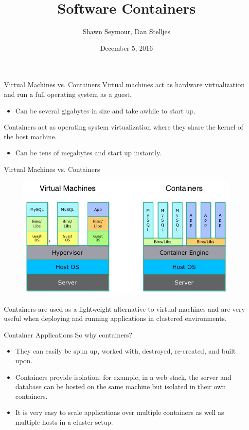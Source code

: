 \documentclass[xcolor=dvipsnames,aspectratio=1610]{beamer}
\title{Software Containers}
\date{December 5, 2016}
\author{Shawn Seymour, Dan Stelljes}
\begin{document}
  \maketitle
  \begin{frame}{Virtual Machines vs. Containers}
      \alert{Virtual machines} act as hardware virtualization and run a full operating system as a guest.
      \begin{itemize}
          \item Can be several gigabytes in size and take awhile to start up.
      \end{itemize}
      \vspace{10px}

      \alert{Containers} act as operating system virtualization where they share the kernel of the host machine.
      \begin{itemize}
          \item Can be tens of megabytes and start up instantly.
      \end{itemize}

  \end{frame}

  \begin{frame}{Virtual Machines vs. Containers}
      \begin{figure}
        \includegraphics[scale=0.5]{container_vs_vm.jpg}
      \end{figure}
      Containers are used as a lightweight alternative to virtual machines and are very useful when deploying and running applications in clustered environments.

    \end{frame}


  \begin{frame}{Container Applications}
    So why containers?

    \begin{itemize}
        \item They can easily be spun up, worked with, destroyed, re-created, and built upon.
        \item Containers provide isolation; for example, in a web stack, the server and database can be hosted on the same machine but isolated in their own containers.
        \item It is very easy to scale applications over multiple containers as well as multiple hosts in a cluster setup.
    \end{itemize}
  \end{frame}
\end{document}
